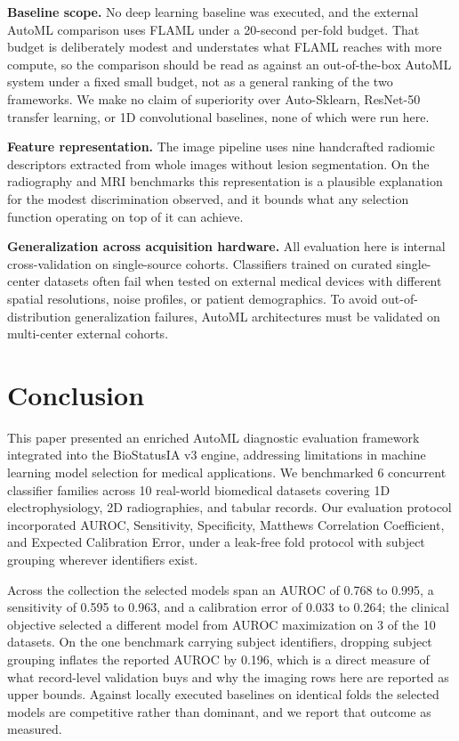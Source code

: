 \documentclass[conference]{IEEEtran}
\begin{document}
\textbf{Baseline scope.} No deep learning baseline was executed, and the external AutoML comparison uses FLAML under a 20-second per-fold budget. That budget is deliberately modest and understates what FLAML reaches with more compute, so the comparison should be read as against an out-of-the-box AutoML system under a fixed small budget, not as a general ranking of the two frameworks. We make no claim of superiority over Auto-Sklearn, ResNet-50 transfer learning, or 1D convolutional baselines, none of which were run here.

\textbf{Feature representation.} The image pipeline uses nine handcrafted radiomic descriptors extracted from whole images without lesion segmentation. On the radiography and MRI benchmarks this representation is a plausible explanation for the modest discrimination observed, and it bounds what any selection function operating on top of it can achieve.

\textbf{Generalization across acquisition hardware.} All evaluation here is internal cross-validation on single-source cohorts. Classifiers trained on curated single-center datasets often fail when tested on external medical devices with different spatial resolutions, noise profiles, or patient demographics. To avoid out-of-distribution generalization failures, AutoML architectures must be validated on multi-center external cohorts.

\section{Conclusion}
This paper presented an enriched AutoML diagnostic evaluation framework integrated into the BioStatusIA v3 engine, addressing limitations in machine learning model selection for medical applications. We benchmarked 6 concurrent classifier families across 10 real-world biomedical datasets covering 1D electrophysiology, 2D radiographies, and tabular records. Our evaluation protocol incorporated AUROC, Sensitivity, Specificity, Matthews Correlation Coefficient, and Expected Calibration Error, under a leak-free fold protocol with subject grouping wherever identifiers exist.

Across the collection the selected models span an AUROC of 0.768 to 0.995, a sensitivity of 0.595 to 0.963, and a calibration error of 0.033 to 0.264; the clinical objective selected a different model from AUROC maximization on 3 of the 10 datasets. On the one benchmark carrying subject identifiers, dropping subject grouping inflates the reported AUROC by 0.196, which is a direct measure of what record-level validation buys and why the imaging rows here are reported as upper bounds. Against locally executed baselines on identical folds the selected models are competitive rather than dominant, and we report that outcome as measured.
\end{document}
